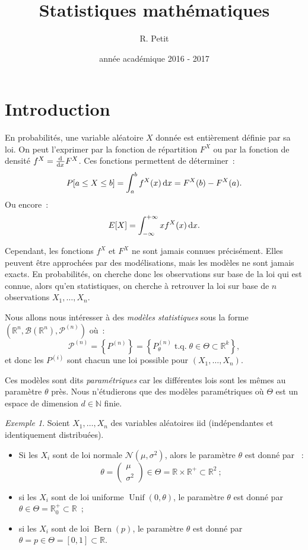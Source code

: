 \documentclass{report}
\title{Statistiques mathématiques}
\author{R. Petit}
\date{année académique 2016 - 2017}
\DeclareMathOperator{\tq}{\text{ t.q. }}
\DeclareMathOperator{\Unif}{Unif}  %
\DeclareMathOperator{\Bern}{Bern}  %
\newcommand{\minfty}{{-\infty}}
\newcommand{\pinfty}{{+\infty}}
\newcommand{\statmod}[4]{\left(#1^{#4}, #2\left(#1^{#4}\right), #3^{\left(#4\right)}\right)}
\newcommand{\Nms}{\mathcal N(\mu, \sigma^2)}
\newcommand{\vvp}[2]{\begin{pmatrix}#1 \\ #2\end{pmatrix}}
\newcommand{\N}{\mathbb N}
\newcommand{\R}{\mathbb R}
\newcommand{\Brl}{\mathcal B}  %
\theoremstyle{definition}
\theoremstyle{remark}
\newtheorem{ex}{Exemple}[chapter]
\begin{document}
\maketitle
\tableofcontents
\newpage
\setcounter{page}{1}

\chapter*{Introduction}
	En probabilités, une variable aléatoire $X$ donnée est entièrement définie par sa loi. On peut l'exprimer par la fonction de répartition $F^X$ ou par la
	fonction de densité $f^X = \od {}xF^X$. Ces fonctions permettent de déterminer~:
	\[P[a \leq X \leq b] = \int_a^bf^X(x)\dif x = F^X(b) - F^X(a).\]
	Ou encore~:
	\[E[X] = \int_\minfty^\pinfty xf^X(x)\dif x.\]

	Cependant, les fonctions $f^X$ et $F^X$ ne sont jamais connues précisément. Elles peuvent être approchées par des modélisations, mais les modèles ne sont
	jamais exacts. En probabilités, on cherche donc les observations sur base de la loi qui est connue, alors qu'en statistiques, on cherche à retrouver la loi
	sur base de $n$ observations $X_1, \ldots, X_n$.

	Nous allons nous intéresser à des \textit{modèles statistiques} sous la forme $\statmod \R\Brl{\mathcal P}n$ où~:
	\[\mathcal P^{(n)} = \left\{P^{(n)}\right\} = \left\{P^{(n)}_\theta \tq \theta \in \Theta \subset \R^k\right\},\]
	et donc les $P^{(i)}$ sont chacun une loi possible pour $(X_1, \ldots, X_n)$.

	Ces modèles sont dits \textit{paramétriques} car les différentes lois sont les mêmes au paramètre $\theta$ près. Nous n'étudierons que des modèles
	paramétriques où $\Theta$ est un espace de dimension $d \in \N$ finie.

	\begin{ex} Soient $X_1,\ldots, X_n$ des variables aléatoires iid (indépendantes et identiquement distribuées).
	\begin{itemize}
		\item Si les $X_i$ sont de loi normale $\Nms$, alors le paramètre $\theta$ est donné par ~:
		      \[\theta = \vvp \mu{\sigma^2} \in \Theta = \R \times \R^+ \subset \R^2~;\]
		\item si les $X_i$ sont de loi uniforme $\Unif(0, \theta)$, le paramètre $\theta$ est donné par $\theta \in \Theta = \R_0^+ \subset \R$~;
		\item si les $X_i$ sont de loi $\Bern(p)$, le paramètre $\theta$ est donné par $\theta = p \in \Theta = [0, 1] \subset \R$.
	\end{itemize}
	\end{ex}
\end{document}
